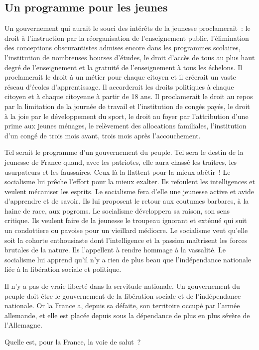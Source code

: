 \documentclass[french,twoside]{book} %
\begin{document}
\subsection[Un programme pour les jeunes]{Un programme pour les jeunes}
\noindent Un gouvernement qui aurait le souci des intérêts de la jeunesse proclamerait : le droit à l’instruction par la réorganisation de l’enseignement public, l’élimination des conceptions obscurantistes admises encore dans les programmes scolaires, l’institution de nombreuses bourses d’études, le droit d’accès de tous au plus haut degré de l’enseignement et la gratuité de l’enseignement à tous les échelons. Il proclamerait le droit à un métier pour chaque citoyen et il créerait un vaste réseau d’écoles d’apprentissage. Il accorderait les droits politiques à chaque citoyen et à chaque citoyenne à partir de 18 ans. Il proclamerait le droit au repos par la limitation de la journée de travail et l’institution de congés payés, le droit à la joie par le développement du sport, le droit au foyer par l’attribution d’une prime aux jeunes ménages, le relèvement des allocations familiales, l’institution d’un congé de trois mois avant, trois mois après l’accouchement.\par
Tel serait le programme d’un gouvernement du peuple. Tel sera le destin de la jeunesse de France quand, avec les patriotes, elle aura chassé les traîtres, les usurpateurs et les faussaires. Ceux-là la flattent pour la mieux abêtir ! Le socialisme lui prêche l’effort pour la mieux exalter. Ils refoulent les intelligences et veulent mécaniser les esprits. Le socialisme fera d’elle une jeunesse active et avide d’apprendre et de savoir. Ils lui proposent le retour aux coutumes barbares, à la haine de race, aux pogroms. Le socialisme développera sa raison, son sens critique. Ils veulent faire de la jeunesse le troupeau ignorant et exténué qui suit un condottiere ou pavoise pour un vieillard médiocre. Le socialisme veut qu’elle soit la cohorte enthousiaste dont l’intelligence et la passion maîtrisent les forces brutales de la nature. Ils l’appellent à rendre hommage à la vassalité. Le socialisme lui apprend qu’il n’y a rien de plus beau que l’indépendance nationale liée à la libération sociale et politique.\par
Il n’y a pas de vraie liberté dans la servitude nationale. Un gouvernement du peuple doit être le gouvernement de la libération sociale et de l’indépendance nationale. Or la France a, depuis sa défaite, son territoire occupé par l’armée allemande, et elle est placée depuis sous la dépendance de plus en plus sévère de l’Allemagne.\par
Quelle est, pour la France, la voie de salut ?
\renewcommand{\leftmark}{11 – Une France indépendante}
\end{document}
